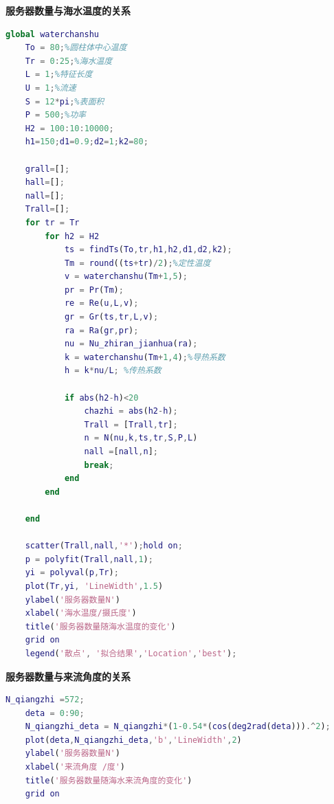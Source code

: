 \documentclass{article}
\begin{document}
 	\textbf{服务器数量与海水温度的关系}
 	\begin{lstlisting}[language=matlab]
 	global waterchanshu
 	To = 80;%圆柱体中心温度
 	Tr = 0:25;%海水温度
 	L = 1;%特征长度
 	U = 1;%流速
 	S = 12*pi;%表面积
 	P = 500;%功率
 	H2 = 100:10:10000;
 	h1=150;d1=0.9;d2=1;k2=80;
 	
 	grall=[];
 	hall=[];
 	nall=[];
 	Trall=[];
 	for tr = Tr
	 	for h2 = H2
		 	ts = findTs(To,tr,h1,h2,d1,d2,k2);
		 	Tm = round((ts+tr)/2);%定性温度
		 	v = waterchanshu(Tm+1,5);
		 	pr = Pr(Tm);
		 	re = Re(u,L,v);
		 	gr = Gr(ts,tr,L,v);
		 	ra = Ra(gr,pr);
		 	nu = Nu_zhiran_jianhua(ra);
		 	k = waterchanshu(Tm+1,4);%导热系数
		 	h = k*nu/L; %传热系数
		 	
		 	if abs(h2-h)<20
			 	chazhi = abs(h2-h);
			 	Trall = [Trall,tr];
			 	n = N(nu,k,ts,tr,S,P,L)
			 	nall =[nall,n];
			 	break;
		 	end
	 	end
 	
 	end
 	
 	scatter(Trall,nall,'*');hold on;
 	p = polyfit(Trall,nall,1);
 	yi = polyval(p,Tr);
 	plot(Tr,yi, 'LineWidth',1.5)
 	ylabel('服务器数量N')
 	xlabel('海水温度/摄氏度')
 	title('服务器数量随海水温度的变化')
 	grid on
 	legend('散点', '拟合结果','Location','best');
 	\end{lstlisting}
 	\textbf{服务器数量与来流角度的关系}
 	\begin{lstlisting}[language=matlab]
 	N_qiangzhi =572;
 	deta = 0:90;
 	N_qiangzhi_deta = N_qiangzhi*(1-0.54*(cos(deg2rad(deta))).^2);
 	plot(deta,N_qiangzhi_deta,'b','LineWidth',2)
 	ylabel('服务器数量N')
 	xlabel('来流角度 /度')
 	title('服务器数量随海水来流角度的变化')
 	grid on
 	\end{lstlisting}
	
\end{document}
